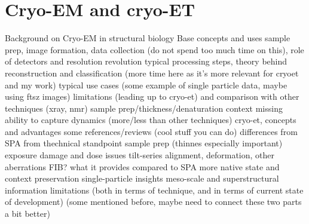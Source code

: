 \chapter{Cryo-EM and cryo-ET}

\begin{outline}
\1 Background on Cryo-EM in structural biology
    \2 Base concepts and uses
        \3 sample prep, image formation, data collection (do not spend too much time on this), role of detectors and resolution revolution \cite{faruqiCCDDetectorsHighresolution2000}
        \3 typical processing steps, theory behind reconstruction and classification (more time here as it's more relevant for cryoet and my work)
    \2 typical use cases (some example of single particle data, maybe using ftsz images)
    \2 limitations (leading up to cryo-et) and comparison with other techniques (xray, nmr)
        \3 sample prep/thickness/denaturation
        \3 context missing
        \3 ability to capture dynamics (more/less than other techniques)
\1 cryo-et, concepts and advantages
    \2 some references/reviews (cool stuff you can do)
        \3 \cite{turkPromiseChallengesCryoelectron2020,lucicCryoelectronTomographyChallenge2013}
    \2 differences from SPA from thechnical standpoint
        \3 sample prep (thinnes especially important)
        \3 exposure damage and dose issues
        \3 tilt-series alignment, deformation, other aberrations
        \3 FIB?
    \2 what it provides compared to SPA
        \3 more native state and context preservation
        \3 single-particle insights
        \3 meso-scale and superstructural information
    \2 limitations (both in terms of technique, and in terms of current state of development)
        \3 (some mentioned before, maybe need to connect these two parts a bit better)
\end{outline}
